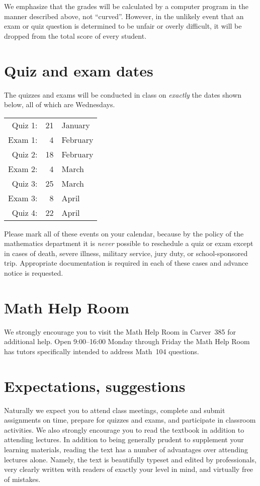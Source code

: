 \documentclass[11pt]{article}
\begin{document}
We emphasize that the grades will be calculated by a computer program
in the manner described
above, not ``curved''. However, in the unlikely event that an exam
or quiz question is determined
to be unfair or overly difficult, it will be dropped from the total score of
every student.

\section{Quiz and exam dates}
The quizzes and exams will be conducted in class
on {\em exactly} the dates shown below, all of which are Wednesdays.
\begin{center}\begin{tabular}{rrl}
Quiz 1:&21&January\\
Exam 1:&4&February\\
Quiz 2:&18&February\\
Exam 2:&4&March\\
Quiz 3:&25&March\\
Exam 3:&8&April\\
Quiz 4:&22&April
\end{tabular}\end{center}
Please mark all of these events on your calendar,
because by the policy of the mathematics department
it is {\em never} possible to reschedule a quiz or exam
except in cases of death, severe illness, military service,
jury duty, or school-sponsored trip.
Appropriate documentation is required in each of these cases
and advance notice is requested.

\section{Math Help Room}\label{MathCenter}
We strongly encourage you to visit the Math Help Room
in Carver~385 for additional help.
Open 9:00--16:00 Monday through Friday the Math Help Room
has tutors specifically intended to address Math~104 questions.

\section{Expectations, suggestions} Naturally we expect you to attend 
class meetings, complete and submit assignments on 
time, prepare for quizzes and exams, and participate in classroom 
activities. We also strongly encourage you to read the textbook
in addition to attending lectures.
In addition to being generally prudent to 
supplement your learning materials, reading the text has a number of 
advantages over attending lectures alone. Namely, the text is beautifully 
typeset and edited by professionals, very clearly written with readers 
of exactly your level in mind, and virtually free of mistakes.
\end{document}
